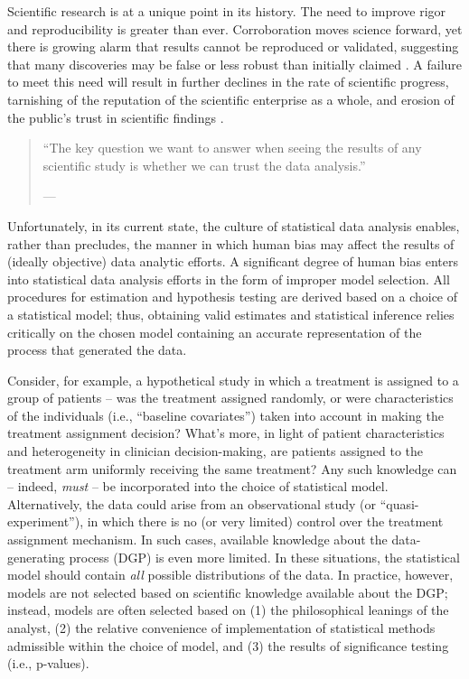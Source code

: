\documentclass[
  12pt, krantz2,
]{krantz}
\newcommand{\1}{\mathbbm{1}}
\theoremstyle{definition}
\theoremstyle{definition}
\theoremstyle{definition}
\theoremstyle{definition}
\theoremstyle{remark}
\begin{document}
Scientific research is at a unique point in its history. The need to improve
rigor and reproducibility is greater than ever. Corroboration moves science
forward, yet there is growing alarm that results cannot be reproduced or
validated, suggesting that many discoveries may be false or less robust than
initially claimed \citep{baker2016there}. A failure to meet this need will result in
further declines in the rate of scientific progress, tarnishing of the
reputation of the scientific enterprise as a whole, and erosion of the public's
trust in scientific findings \citep{munafo2017manifesto, naturenews2_2015}.

\begin{quote}
``The key question we want to answer when seeing the results of any scientific
study is whether we can trust the data analysis.''

--- \citet{peng2015reproducibility}
\end{quote}

Unfortunately, in its current state, the culture of statistical data analysis
enables, rather than precludes, the manner in which human bias may affect the
results of (ideally objective) data analytic efforts. A significant degree of
human bias enters into statistical data analysis efforts in the form of improper
model selection. All procedures for estimation and hypothesis testing are
derived based on a choice of a statistical model; thus, obtaining valid
estimates and statistical inference relies critically on the chosen model
containing an accurate representation of the process that generated the data.

Consider, for example, a hypothetical study in which a treatment is assigned to
a group of patients -- was the treatment assigned randomly, or were
characteristics of the individuals (i.e., ``baseline covariates'') taken into
account in making the treatment assignment decision? What's more, in light of
patient characteristics and heterogeneity in clinician decision-making, are
patients assigned to the treatment arm uniformly receiving the same treatment?
Any such knowledge can -- indeed, \emph{must} -- be incorporated into the choice of
statistical model. Alternatively, the data could arise from an observational
study (or ``quasi-experiment''), in which there is no (or very limited) control
over the treatment assignment mechanism. In such cases, available knowledge
about the data-generating process (DGP) is even more limited. In these
situations, the statistical model should contain \emph{all} possible distributions of
the data. In practice, however, models are not selected based on scientific
knowledge available about the DGP; instead, models are often selected based on
(1) the philosophical leanings of the analyst, (2) the relative convenience of
implementation of statistical methods admissible within the choice of model, and
(3) the results of significance testing (i.e., p-values).
\end{document}
